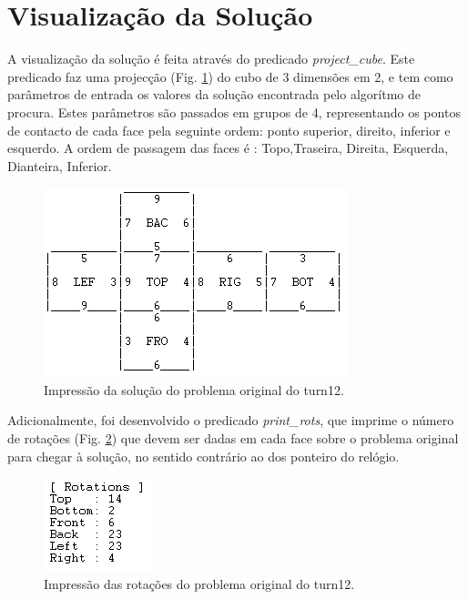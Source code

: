
\section{Visualização da Solução}
\label{rest:5}

A visualização da solução é feita através do predicado \textit{project\_cube}.
Este predicado faz uma projecção (Fig. \ref{fig:2}) do cubo de 3 dimensões em 2, e tem como parâmetros de entrada os valores da solução encontrada pelo algorítmo de procura. Estes parâmetros são passados em grupos de 4, representando os pontos de contacto de cada face pela seguinte ordem: ponto superior, direito, inferior e esquerdo. 
A ordem de passagem das faces é : Topo,Traseira, Direita, Esquerda, Dianteira, Inferior.

\begin{figure}[H]
\begin{center}
\includegraphics[scale=0.6]{resol.png}
\caption{Impressão da solução do problema original do turn12.}
\label{fig:2}
\end{center}
\end{figure}

Adicionalmente, foi desenvolvido o predicado \textit{print\_rots}, que imprime o número de rotações (Fig. \ref{fig:3})  que devem ser dadas em cada face sobre o problema original para chegar à solução, no sentido contrário ao dos ponteiro do relógio.

\begin{figure}[H]
\begin{center}
\includegraphics[scale=0.6]{rots.png}
\caption{Impressão das rotações do problema original do turn12.}
\label{fig:3}
\end{center}
\end{figure}



